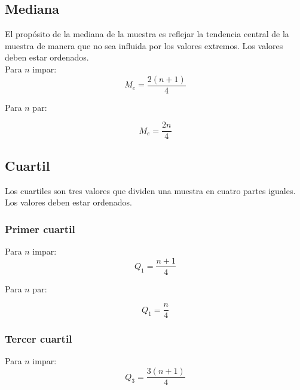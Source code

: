 \documentclass{report}
\begin{document}
        \subsection*{Mediana}
          El propósito de la mediana de la muestra es reflejar la tendencia central 
          de la muestra de manera que no sea influida por los valores extremos. Los
          valores deben estar ordenados.\\
          \indent Para $n$ impar:
          \begin{equation*}
            M_e=\frac{2(n+1)}{4}
          \end{equation*}

          Para $n$ par:

          \begin{equation*}
            M_e=\frac{2n}{4}
          \end{equation*}
       
        \subsection*{Cuartil}
          Los cuartiles son tres valores que dividen una muestra en cuatro partes
          iguales. Los valores deben estar ordenados.
          
          \subsubsection*{Primer cuartil}
          
            \indent Para $n$ impar:
            \begin{equation*}
              Q_1=\frac{n+1}{4}
            \end{equation*}

            Para $n$ par:

            \begin{equation*}
              Q_1=\frac{n}{4}
            \end{equation*}

          \subsubsection*{Tercer cuartil}
            
            \indent Para $n$ impar:
            \begin{equation*}
              Q_3=\frac{3(n+1)}{4}
            \end{equation*}
\end{document}
